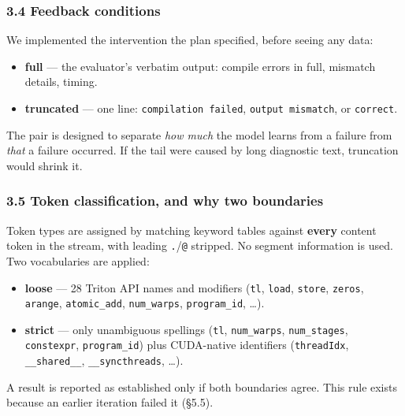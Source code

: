 \documentclass[
  11pt,
]{article}
\providecommand{\tightlist}{%
  \setlength{\itemsep}{0pt}\setlength{\parskip}{0pt}}
\begin{document}
\hypertarget{feedback-conditions}{%
\subsubsection{3.4 Feedback conditions}\label{feedback-conditions}}

We implemented the intervention the plan specified, before seeing any
data:

\begin{itemize}
\tightlist
\item
  \textbf{full} --- the evaluator's verbatim output: compile errors in
  full, mismatch details, timing.
\item
  \textbf{truncated} --- one line: \texttt{compilation\ failed},
  \texttt{output\ mismatch}, or \texttt{correct}.
\end{itemize}

The pair is designed to separate \emph{how much} the model learns from a
failure from \emph{that} a failure occurred. If the tail were caused by
long diagnostic text, truncation would shrink it.

\hypertarget{token-classification-and-why-two-boundaries}{%
\subsubsection{3.5 Token classification, and why two
boundaries}\label{token-classification-and-why-two-boundaries}}

Token types are assigned by matching keyword tables against
\textbf{every} content token in the stream, with leading
\texttt{.}/\texttt{@} stripped. No segment information is used. Two
vocabularies are applied:

\begin{itemize}
\tightlist
\item
  \textbf{loose} --- 28 Triton API names and modifiers (\texttt{tl},
  \texttt{load}, \texttt{store}, \texttt{zeros}, \texttt{arange},
  \texttt{atomic\_add}, \texttt{num\_warps}, \texttt{program\_id},
  \ldots).
\item
  \textbf{strict} --- only unambiguous spellings (\texttt{tl},
  \texttt{num\_warps}, \texttt{num\_stages}, \texttt{constexpr},
  \texttt{program\_id}) plus CUDA-native identifiers
  (\texttt{threadIdx}, \texttt{\_\_shared\_\_},
  \texttt{\_\_syncthreads}, \ldots).
\end{itemize}

A result is reported as established only if both boundaries agree. This
rule exists because an earlier iteration failed it (§5.5).
\end{document}
